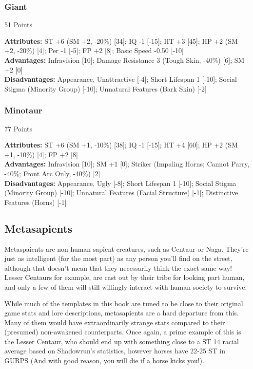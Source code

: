 \begin{multicols*}{3}
	\subsubsection*{Giant}
	\begin{flushright}
		51 Points
	\end{flushright}
	\textbf{Attributes:} 
	ST +6 (SM +2, -20\%) [34]; IQ -1 [-15]; HT +3 [45]; HP +2 (SM +2, -20\%) [4]; Per -1 [-5]; FP +2 [8]; Basic Speed -0.50 [-10]
	\\\textbf{Advantages:} 
	Infravision [10]; Damage Resistance 3 (Tough Skin, -40\%) [6]; SM +2 [0]
	\\\textbf{Disadvantages:} 
	Appearance, Unattractive [-4]; Short Lifespan 1 [-10]; Social Stigma (Minority Group) [-10]; Unnatural Features (Bark Skin) [-2]
	
	\subsubsection*{Minotaur}
	\begin{flushright}
		77 Points
	\end{flushright}
	\textbf{Attributes:} 
	ST +6 (SM +1, -10\%) [38]; IQ -1 [-15]; HT +4 [60]; HP +2 (SM +1, -10\%) [4]; FP +2 [8]
	\\\textbf{Advantages:} 
	Infravision [10]; SM +1 [0]; Striker (Impaling Horns; Cannot Parry, -40\%; Front Arc Only, -40\%) [2]
	\\\textbf{Disadvantages:} 
	Appearance, Ugly [-8]; Short Lifespan 1 [-10]; Social Stigma (Minority Group) [-10]; Unnatural Features (Facial Structure) [-1]; Distinctive Features (Horns) [-1]
	
	\subsection{Metasapients}
	
	Metaspaients are non-human sapient creatures, such as Centaur or Naga. They're just as intelligent (for the most part) as any person you'll find on the street, although that doesn't mean that they necessarily think the exact same way! Lesser Centaurs for example, are cast out by their tribe for looking part human, and only a few of them will still willingly interact with human society to survive.
	
	While much of the templates in this book are tuned to be close to their original game stats and lore descriptions, metasapients are a hard departure from this. Many of them would have extraordinarily strange stats compared to their (presumed) non-awakened counterparts. Once again, a prime example of this is the Lesser Centaur, who should end up with something close to a ST 14 racial average based on Shadowrun's statistics, however horses have 22-25 ST in GURPS (And with good reason, you will die if a horse kicks you!).
	

\end{multicols*}
